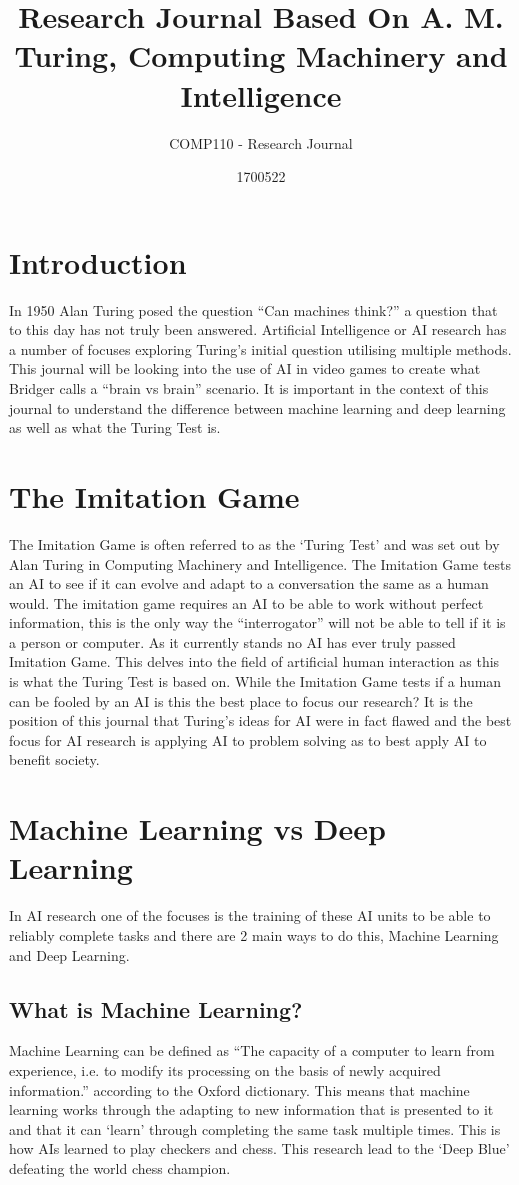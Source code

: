 \documentclass[10pt,a4paper]{scrartcl}
\title{Research Journal Based On A. M. Turing, Computing Machinery and Intelligence}
\subtitle{COMP110 - Research Journal}
\author{1700522}
\begin{document}
	\maketitle
	\section{Introduction}
	In 1950 Alan Turing posed the question ``Can machines think?''\cite{turingComputing} a question that to this day has not truly been answered. Artificial Intelligence or AI research has a number of focuses exploring Turing's initial question utilising multiple methods. This journal will be looking into the use of AI in video games to create what Bridger calls a ``brain vs brain''\cite{BridgerFundamentalAI} scenario. It is important in the context of this journal to understand the difference between machine learning and deep learning as well as what the Turing Test is. 
	\section{The Imitation Game}
The Imitation Game is often referred to as the `Turing Test' and was set out by Alan Turing in Computing Machinery and Intelligence\cite{turingComputing}. The Imitation Game tests an AI to see if it can evolve and adapt to a conversation the same as a human would. The imitation game requires an AI to be able to work without perfect information, this is the only way the ``interrogator'' will not be able to tell if it is a person or computer. As it currently stands no AI has ever truly passed Imitation Game. This delves into the field of artificial human interaction as this is what the Turing Test is based on. While the Imitation Game tests if a human can be fooled by an AI is this the best place to focus our research? It is the position of this journal that Turing's ideas for AI were in fact flawed and the best focus for AI research is applying AI to problem solving as to best apply AI to benefit society.   
	\section{Machine Learning vs Deep Learning}
		In AI research one of the focuses is the training of these AI units to be able to reliably complete tasks and there are 2 main ways to do this, Machine Learning and Deep Learning.
		\subsection{What is Machine Learning?}
		Machine Learning can be defined as ``The capacity of a computer to learn from experience, i.e. to modify its processing on the basis of newly acquired information.'' according to the Oxford dictionary\cite{OxfordDictionary}. This means that machine learning works through the adapting to new information that is presented to it and that it can `learn' through completing the same task multiple times. This is how AIs learned to play checkers\cite{SamuelCheckers} and chess\cite{ShannonChess}. This research lead to the `Deep Blue' defeating the world chess champion\cite{DeepBlue}. 
		
\end{document}
